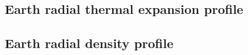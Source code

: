 \subsection{Earth radial thermal expansion profile}  %
\newpage %
\subsection{Earth radial density profile}  %





